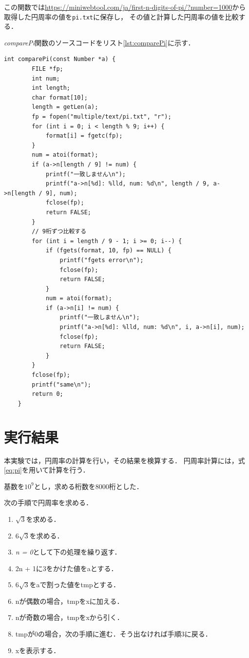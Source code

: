 \documentclass[a4paper,11pt,dvipdfmx]{jsarticle}
\begin{document}
この関数では\url{https://miniwebtool.com/ja/first-n-digits-of-pi/?number=1000}から取得した円周率の値を\texttt{pi.txt}に保存し，
その値と計算した円周率の値を比較する．


\textit{comparePi}関数のソースコードをリスト\ref{lst:comparePi}に示す．

\begin{lstlisting}[caption=\texttt{comparePi}関数,label=lst:comparePi]
    int comparePi(const Number *a) {
        FILE *fp;
        int num;
        int length;
        char format[10];
        length = getLen(a);
        fp = fopen("multiple/text/pi.txt", "r");
        for (int i = 0; i < length % 9; i++) {
            format[i] = fgetc(fp);
        }
        num = atoi(format);
        if (a->n[length / 9] != num) {
            printf("一致しません\n");
            printf("a->n[%d]: %lld, num: %d\n", length / 9, a->n[length / 9], num);
            fclose(fp);
            return FALSE;
        }
        // 9桁ずつ比較する
        for (int i = length / 9 - 1; i >= 0; i--) {
            if (fgets(format, 10, fp) == NULL) {
                printf("fgets error\n");
                fclose(fp);
                return FALSE;
            }
            num = atoi(format);
            if (a->n[i] != num) {
                printf("一致しません\n");
                printf("a->n[%d]: %lld, num: %d\n", i, a->n[i], num);
                fclose(fp);
                return FALSE;
            }
        }
        fclose(fp);
        printf("same\n");
        return 0;
    }
\end{lstlisting}


\section{実行結果}
\label{sec:result}
本実験では，円周率の計算を行い，その結果を検算する．
円周率計算には，式\eqref{eq:pi}を用いて計算を行う．

基数を$10^9$とし，求める桁数を8000桁とした．

次の手順で円周率を求める．
\begin{enumerate}
    \item $\sqrt{3}$を求める．
    \item 6$\sqrt{3}$を求める．
    \item \textit{n = 0}として下の処理を繰り返す．
    \item 2n + 1に3をかけた値をaとする．
    \item $6\sqrt{3}$をaで割った値をtmpとする．
    \item nが偶数の場合，tmpをxに加える．
    \item nが奇数の場合，tmpをxから引く．
    \item tmpが0の場合，次の手順に進む．そう出なければ手順3に戻る．
    \item xを表示する．
\end{enumerate}
\end{document}
